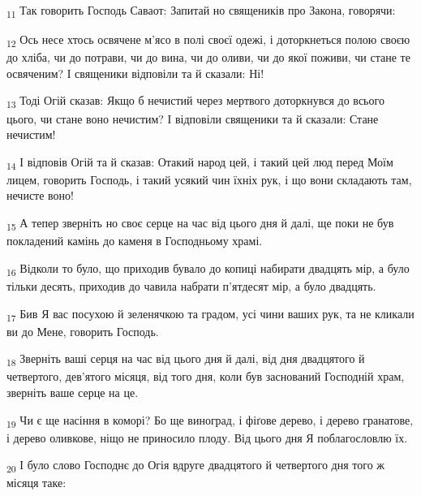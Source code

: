 \begin{tcolorbox}
\textsubscript{11} Так говорить Господь Саваот: Запитай но священиків про Закона, говорячи:
\end{tcolorbox}
\begin{tcolorbox}
\textsubscript{12} Ось несе хтось освячене м'ясо в полі своєї одежі, і доторкнеться полою своєю до хліба, чи до потрави, чи до вина, чи до оливи, чи до якої поживи, чи стане те освяченим? І священики відповіли та й сказали: Ні!
\end{tcolorbox}
\begin{tcolorbox}
\textsubscript{13} Тоді Огій сказав: Якщо б нечистий через мертвого доторкнувся до всього цього, чи стане воно нечистим? І відповіли священики та й сказали: Стане нечистим!
\end{tcolorbox}
\begin{tcolorbox}
\textsubscript{14} І відповів Огій та й сказав: Отакий народ цей, і такий цей люд перед Моїм лицем, говорить Господь, і такий усякий чин їхніх рук, і що вони складають там, нечисте воно!
\end{tcolorbox}
\begin{tcolorbox}
\textsubscript{15} А тепер зверніть но своє серце на час від цього дня й далі, ще поки не був покладений камінь до каменя в Господньому храмі.
\end{tcolorbox}
\begin{tcolorbox}
\textsubscript{16} Відколи то було, що приходив бувало до копиці набирати двадцять мір, а було тільки десять, приходив до чавила набрати п'ятдесят мір, а було двадцять.
\end{tcolorbox}
\begin{tcolorbox}
\textsubscript{17} Бив Я вас посухою й зеленячкою та градом, усі чини ваших рук, та не кликали ви до Мене, говорить Господь.
\end{tcolorbox}
\begin{tcolorbox}
\textsubscript{18} Зверніть ваші серця на час від цього дня й далі, від дня двадцятого й четвертого, дев'ятого місяця, від того дня, коли був заснований Господній храм, зверніть ваше серце на це.
\end{tcolorbox}
\begin{tcolorbox}
\textsubscript{19} Чи є ще насіння в коморі? Бо ще виноград, і фіґове дерево, і дерево гранатове, і дерево оливкове, ніщо не приносило плоду. Від цього дня Я поблагословлю їх.
\end{tcolorbox}
\begin{tcolorbox}
\textsubscript{20} І було слово Господнє до Огія вдруге двадцятого й четвертого дня того ж місяця таке:
\end{tcolorbox}
